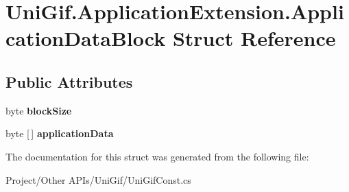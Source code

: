 \hypertarget{struct_uni_gif_1_1_application_extension_1_1_application_data_block}{}\section{Uni\+Gif.\+Application\+Extension.\+Application\+Data\+Block Struct Reference}
\label{struct_uni_gif_1_1_application_extension_1_1_application_data_block}
\subsection*{Public Attributes}
\begin{DoxyCompactItemize}
\item 
\mbox{\label{struct_uni_gif_1_1_application_extension_1_1_application_data_block_ad821970f8342c9a6c8c59fa213cac604}} 
byte {\bfseries block\+Size}
\item 
\mbox{\label{struct_uni_gif_1_1_application_extension_1_1_application_data_block_aca6b270b9b4bc93feb7da16d9048e463}} 
byte \mbox{[}$\,$\mbox{]} {\bfseries application\+Data}
\end{DoxyCompactItemize}


The documentation for this struct was generated from the following file\+:\begin{DoxyCompactItemize}
\item 
Project/\+Other A\+P\+Is/\+Uni\+Gif/Uni\+Gif\+Const.\+cs\end{DoxyCompactItemize}
